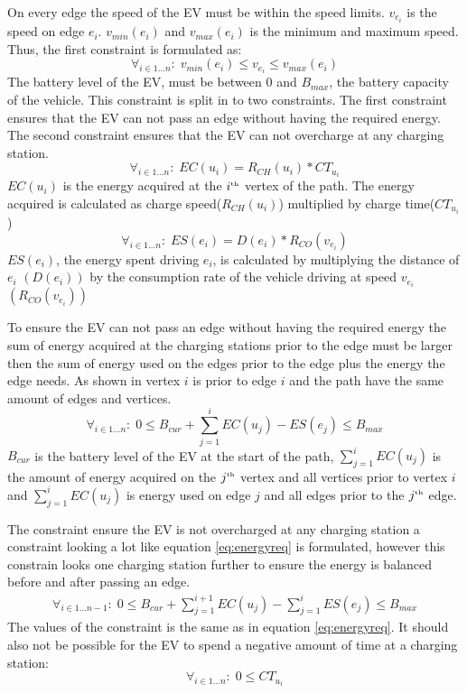On every edge the speed of the EV must be within the speed limits. $v_{e_i}$ is the speed on edge $e_i$. $v_{min}(e_i)$ and $v_{max}(e_i)$ is the minimum and maximum speed. Thus, the first constraint is formulated as:
\begin{equation*}
\forall_{i\in1 \dots n }:\;v_{min}(e_i) \leq v_{e_i} \leq v_{max}(e_i)
\end{equation*}
The battery level of the EV, must be between $0$ and $B_{max}$, the battery capacity of the vehicle.
This constraint is split in to two constraints. The first constraint ensures that the EV can not pass an edge without having the required energy. The second constraint ensures that the EV can not overcharge at any charging station.
\begin{equation*}
\forall_{i\in1 \dots n }:\; EC(u_i) = R_{CH}(u_i) * CT_{u_i}
\end{equation*}
$EC(u_i)$ is the energy acquired at the $i^{\text{\tiny th}}$ vertex of the path. The energy acquired is calculated as charge speed($R_{CH}(u_i)$) multiplied by charge time($CT_{u_i}$)
\begin{equation*}
\forall_{i\in1 \dots n }:\; ES(e_i) = D(e_i)*R_{CO}(v_{e_i})
\end{equation*}
$ES(e_i)$, the energy spent driving $e_i$, is calculated by multiplying the distance of $e_i$ $(D(e_i))$ by the consumption rate of the vehicle driving at speed $v_{e_i}$ $(R_{CO}(v_{e_i}))$

To ensure the EV can not pass an edge without having the required energy the sum of energy acquired at the charging stations prior to the edge must be larger then the sum of energy used on the edges prior to the edge plus the energy the edge needs. As shown in  vertex $i$ is prior to edge $i$ and the path have the same amount of edges and vertices.
\begin{equation*}
\forall_{i\in1 \dots n }:\;0 \leq B_{cur} + \sum_{j=1}^{i} EC(u_j) - ES(e_j) \leq B_{max}
\end{equation*}\label{eq:energyreq}
$B_{cur}$ is the battery level of the EV at the start of the path, $ \sum_{j=1}^{i} EC(u_j)$ is the amount of energy acquired on the $j^{\text{\tiny th}}$ vertex and all vertices prior to vertex $i$ and $\sum_{j=1}^{i} EC(u_j)$ is energy used on edge $j$ and all edges prior to the $j^{\text{\tiny th}}$ edge.

The constraint ensure the EV is not overcharged at any charging station a constraint looking a lot like equation \ref{eq:energyreq} is formulated, however this constrain looks one charging station further to ensure the energy is balanced before and after passing an edge.
\begin{equation*}
\begin{aligned}
\forall_{i\in1 \dots n-1}:\;0 \leq B_{cur} + \sum_{j=1}^{i+1} EC(u_j) - \sum_{j=1}^{i} ES(e_j) \leq B_{max}
\end{aligned}
\end{equation*}
The values of the constraint is the same as in equation \ref{eq:energyreq}. It should also not be possible for the EV to spend a negative amount of time at a charging station:
\begin{equation*}
\forall_{i\in1 \dots n }:\; 0 \leq CT_{u_i}
\end{equation*}